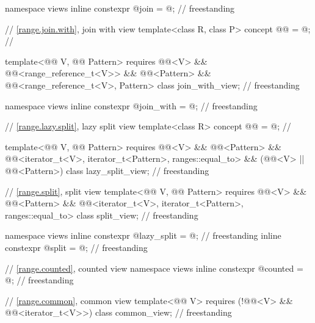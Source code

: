 \begin{codeblock}
{  namespace views { inline constexpr @\unspecnc@ join = @\unspecnc@; }              // freestanding

  // \ref{range.join.with}, join with view
  template<class R, class P>
    concept @@ = @\seebelow@; // \expos

  template<@@ V, @@ Pattern>
    requires @@<V> && @@<range_reference_t<V>>
          && @@<Pattern>
          && @@<range_reference_t<V>, Pattern>
  class join_with_view;                                                             // freestanding

  namespace views { inline constexpr @\unspecnc@ join_with = @\unspecnc@; }         // freestanding

  // \ref{range.lazy.split}, lazy split view
  template<class R>
    concept @@ = @\seebelow@;   // \expos

  template<@@ V, @@ Pattern>
    requires @@<V> && @@<Pattern> &&
             @@<iterator_t<V>, iterator_t<Pattern>, ranges::equal_to> &&
             (@@<V> || @@<Pattern>)
  class lazy_split_view;                                                            // freestanding

  // \ref{range.split}, split view
 template<@@ V, @@ Pattern>
   requires @@<V> && @@<Pattern> &&
            @@<iterator_t<V>, iterator_t<Pattern>, ranges::equal_to>
  class split_view;                                                                 // freestanding

  namespace views {
    inline constexpr @\unspecnc@ lazy_split = @\unspecnc@;                          // freestanding
    inline constexpr @\unspecnc@ split = @\unspecnc@;                               // freestanding
  }

  // \ref{range.counted}, counted view
  namespace views { inline constexpr @\unspecnc@ counted = @\unspecnc@; }           // freestanding

  // \ref{range.common}, common view
  template<@@ V>
    requires (!@@<V> && @@<iterator_t<V>>)
  class common_view;                                                                // freestanding

}
\end{codeblock}
